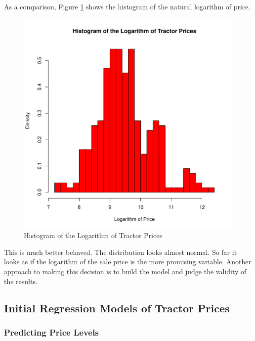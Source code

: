 \pagebreak
As a comparison, Figure \ref{fig:hist_log_price} shows the histogram of the natural logarithm of
price.

\begin{figure}[h!]
  \centering
  \includegraphics[scale = 0.5, keepaspectratio=true]{../Figures/hist_log_price}
  \caption{Histogram of the Logarithm of Tractor Prices} \label{fig:hist_log_price}
\end{figure}

This is much better behaved. The distribution looks almost normal. 
So far it looks as if the logarithm of the sale price
is the more promising variable.
Another approach to making this decision is
to build the model and judge the validity of the results.





\pagebreak
\subsection{Initial Regression Models of Tractor Prices}

\subsubsection{Predicting Price Levels}


